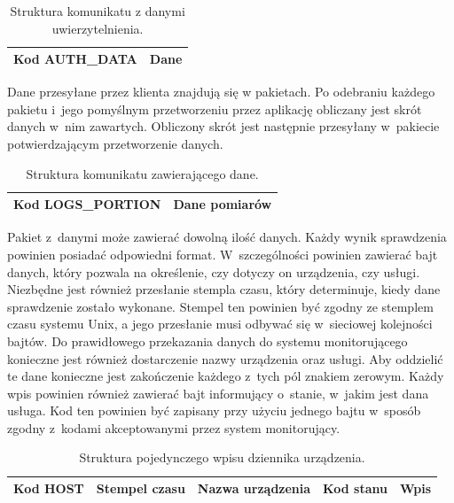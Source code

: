 \begin{table}[H]
\centering
\caption{Struktura komunikatu z danymi uwierzytelnienia. }
\begin{tabular}{|p{3cm}|p{6cm}|}
\hline
Kod AUTH\_DATA & Dane \\
\hline
\end{tabular}
\end{table}

Dane przesyłane przez klienta znajdują się w pakietach. Po odebraniu
każdego pakietu i~jego pomyślnym przetworzeniu przez aplikację
obliczany jest skrót danych w~nim zawartych. Obliczony skrót jest
następnie przesyłany w~pakiecie potwierdzającym przetworzenie danych.

\begin{table}[H]
\centering
\caption{Struktura komunikatu zawierającego dane. }
\begin{tabular}{|p{3cm}|p{6cm}|}
\hline
\raggedright{Kod LOGS\_PORTION} & Dane pomiarów  \\
\hline
\end{tabular}
\end{table}

Pakiet z~danymi może zawierać dowolną ilość danych. Każdy wynik
sprawdzenia powinien posiadać odpowiedni format. W~szczególności
powinien zawierać bajt danych, który pozwala na określenie, czy
dotyczy on urządzenia, czy usługi. Niezbędne jest również przesłanie
stempla czasu, który determinuje, kiedy dane sprawdzenie zostało
wykonane. Stempel ten powinien być zgodny ze stemplem czasu systemu
Unix, a jego przesłanie musi odbywać się w~sieciowej kolejności
bajtów. Do prawidłowego przekazania danych do systemu monitorującego
konieczne jest również dostarczenie nazwy urządzenia oraz usługi. Aby
oddzielić te dane konieczne jest zakończenie każdego z~tych pól
znakiem zerowym. Każdy wpis powinien również zawierać bajt informujący
o~stanie, w~jakim jest dana usługa. Kod ten powinien być zapisany przy
użyciu jednego bajtu w~sposób zgodny z~kodami akceptowanymi przez
system monitorujący.

\begin{table}[H]
\centering
\caption{Struktura pojedynczego wpisu dziennika urządzenia. }
\begin{tabular}{|p{2cm}|p{3cm}|p{4cm}|p{2cm}|p{2cm}|}
\hline
Kod HOST & Stempel czasu & Nazwa urządzenia & Kod stanu & Wpis  \\
\hline
\end{tabular}
\end{table}

